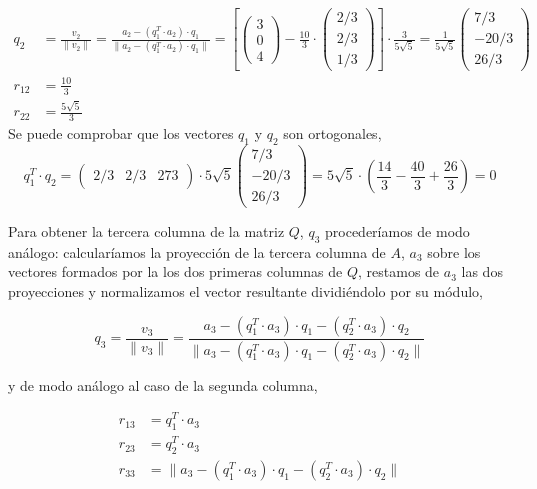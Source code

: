 \begin{align*}
q_2&=\frac{v_2}{\lVert v_2 \rVert}=\frac{a_2-(q_1^T\cdot a_2)\cdot q_1}{\lVert a_2-(q_1^T\cdot a_2)\cdot q_1 \rVert}=\left[\begin{pmatrix}
3\\
0\\
4
\end{pmatrix}-\frac{10}{3}\cdot \begin{pmatrix}
2/3\\
2/3\\
1/3
\end{pmatrix}\right]\cdot \frac{3}{5\sqrt{5}}=\frac{1}{5\sqrt{5}}\begin{pmatrix}
7/3\\
-20/3\\
26/3
\end{pmatrix}\\
r_{12}&=\frac{10}{3}\\
r_{22}&=\frac{5\sqrt{5}}{3}
\end{align*}
Se puede comprobar que los vectores $q_1$ y $q_2$ son ortogonales,
\begin{equation*}
q_1^T\cdot q_2= \begin{pmatrix}
2/3& 2/3& 273
\end{pmatrix}\cdot {5\sqrt{5}}\begin{pmatrix}
7/3\\
-20/3\\
26/3
\end{pmatrix}={5\sqrt{5}}\cdot \left(\frac{14}{3}-\frac{40}{3}+\frac{26}{3}\right)=0
\end{equation*}

Para obtener la tercera columna de la matriz $Q$, $q_3$ procederíamos de modo análogo: calcularíamos la proyección de la tercera columna de $A$, $a_3$ sobre los vectores formados por la los dos primeras columnas de $Q$, restamos de $a_3$ las dos proyecciones y normalizamos el vector resultante dividiéndolo por su módulo,

\begin{equation*}
q_3=\frac{v_3}{\lVert v_3 \rVert}=\frac{a_3-(q_1^T\cdot a_3)\cdot q_1-(q_2^T\cdot a_3)\cdot q_2}{\lVert a_3-(q_1^T\cdot a_3)\cdot q_1-(q_2^T\cdot a_3)\cdot q_2 \rVert}
\end{equation*} 

y de modo análogo al caso de la segunda columna,

\begin{align*}
r_{13}&=q_1^T\cdot a_3\\
r_{23}&=q_2^T\cdot a_3\\
r_{33}&=\lVert a_3-(q_1^T\cdot a_3)\cdot q_1-(q_2^T\cdot a_3)\cdot q_2 \rVert
\end{align*}

